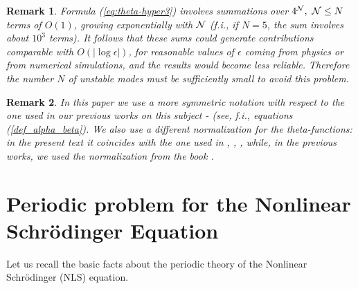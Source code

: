 \documentclass[12pt]{article}
\newtheorem{remark}{Remark}
\newcommand{\eps}{{\epsilon}}
\begin{document}
\begin{remark}
Formula (\ref{eq:theta-hyper3}) involves summations over $4^{\cal N}, \ {\cal N}\le N$ terms of $O(1)$, growing exponentially with $\cal N$ (f.i., if $N=5$, the sum involves about $10^3$ terms). It follows that these sums could generate contributions comparable with $O(|\log\eps|)$, for reasonable values of $\eps$ coming from physics or from numerical simulations, and the results would become less reliable. Therefore the number $N$ of unstable modes must be sufficiently small to avoid this problem.   
\end{remark}

\begin{remark}
In this paper we use a more symmetric notation with respect to the one used in our previous works on this subject \cite{GS1}-\cite{GS5} (see, f.i., equations (\ref{def_alpha_beta}). We also use a different normalization for the theta-functions: in the present text it coincides with the one used in \cite{Fay}, \cite{BBEIM}, \cite{Dubrovin2}, while, in the previous works, we used the normalization from the book \cite{Mum1983}. 
\end{remark}

\section{Periodic problem for the Nonlinear Schr\"odinger Equation}
\label{sec:periodicNLS}

Let us recall the basic facts about the periodic theory of the Nonlinear Schr\"odinger (NLS) equation.
\end{document}
